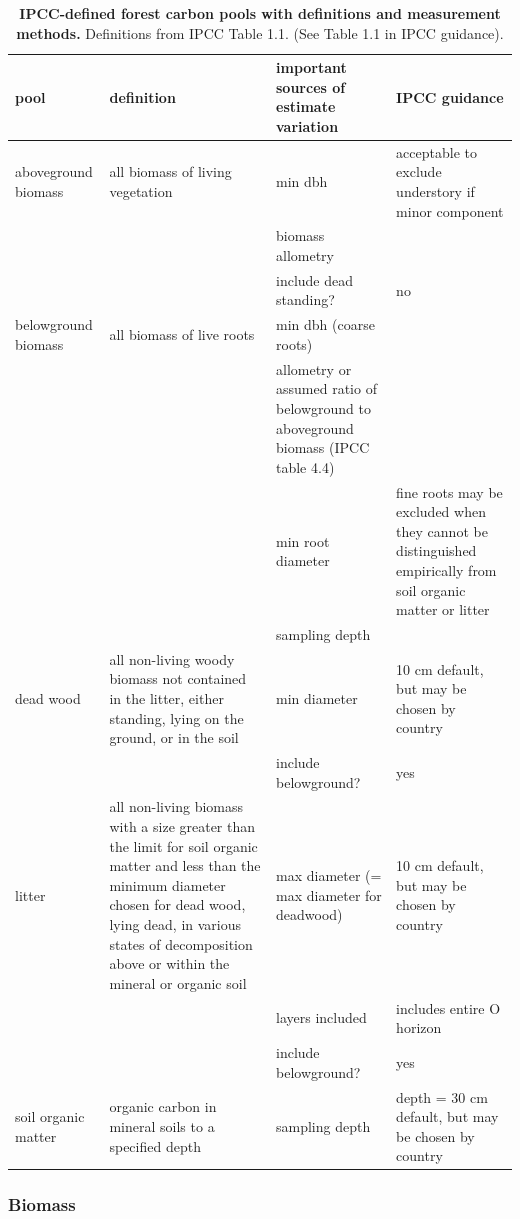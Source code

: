 \documentclass[, manuscript]{copernicus}
\begin{document}
\begin{table}
\caption{\label{tab:table_pools}\textbf{IPCC-defined forest carbon pools with definitions and measurement methods.} Definitions from IPCC Table 1.1. (See Table 1.1 in IPCC guidance).}
\centering
\begin{tabu} to 
\hline
\textbf{pool} & \textbf{definition} & \textbf{important sources of estimate variation} & \textbf{IPCC guidance}\\
\hline
aboveground biomass & all biomass of living vegetation & min dbh & acceptable to exclude understory if minor component\\
\hline
 &  & biomass allometry & \\
\hline
 &  & include dead standing? & no\\
\hline
belowground biomass & all biomass of live roots & min dbh (coarse roots) & \\
\hline
 &  & allometry or assumed ratio of belowground to aboveground biomass (IPCC table 4.4) & \\
\hline
 &  & min root diameter & fine roots may be excluded when they cannot be distinguished empirically from soil organic matter or litter\\
\hline
 &  & sampling depth & \\
\hline
dead wood & all non-living woody biomass not contained in the litter, either standing, lying on the ground, or in the soil & min diameter & 10 cm default, but may be chosen by country\\
\hline
 &  & include belowground? & \vphantom{1} yes\\
\hline
litter & all non-living biomass with a size greater than the limit for soil organic matter  and less than the minimum diameter chosen for dead wood, lying dead, in various states of decomposition above or within the mineral or organic soil & max diameter (= max diameter for deadwood) & 10 cm default, but may be chosen by country\\
\hline
 &  & layers included & includes entire O horizon\\
\hline
 &  & include belowground? & yes\\
\hline
soil organic matter & organic carbon in mineral soils to a specified depth & sampling depth & depth = 30 cm default, but may be chosen by country\\
\hline
\end{tabu}
\end{table}

\subsubsection{Biomass}
\end{document}
